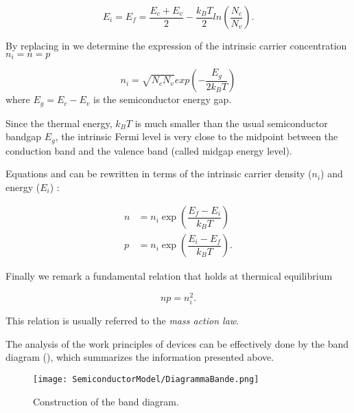 \begin{equation}
\label{eq: midgap equilibrium}
E_i=E_f=\dfrac{E_c+E_v}{2} - \dfrac{k_B T}{2}ln\left(\dfrac{N_c}{N_v}\right).
\end{equation}

By replacing  in  we determine the expression of the intrinsic carrier concentration $n_i=n=p$

\begin{equation}
\label{eq: ni equilibrium NcNv}
n_i = \sqrt{N_cN_v}exp\left(-\dfrac{E_g}{2k_B T}\right)
\end{equation}
where $E_g=E_c-E_v$ is the semiconductor energy gap.

\begin{Osservazione}
Since the thermal energy, $k_BT$ is much smaller than the usual semiconductor bandgap $E_g$, the intrinsic Fermi level is very close to the midpoint between the conduction band and the valence band (called midgap energy level).
\end{Osservazione}

Equations  and  can be rewritten in terms of the intrinsic carrier density ($n_i$) and energy ($E_i$) :

\begin{align}
n & = n_i \exp\left(\dfrac{E_f-E_i}{k_B T}\right) \label{eq: n density mb}\\
p & = n_i \exp\left(\dfrac{E_i-E_f}{k_B T}\right)  \label{eq: p density mb}.
\end{align}

Finally we remark a fundamental relation that holds at thermical equilibrium

\begin{equation}
\label{eq: legge di azione di massa}
np=n_i^2.
\end{equation}

This relation is usually referred to the \textit{mass action law}.

The analysis of the work principles of devices can be effectively done by the band diagram (), which summarizes the information presented above.
\begin{figure}[!h]
\centering
\texttt{[image: SemiconductorModel/DiagrammaBande.png]}
\caption{Construction of the band diagram.}
\label{fig: band diagram}
\end{figure}

